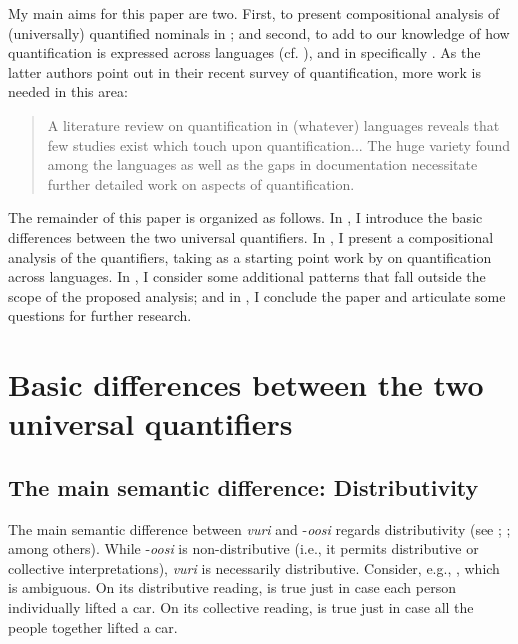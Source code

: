 \documentclass[output=paper]{langsci/langscibook}
\begin{document}
My main aims for this paper are two. First, to present compositional analysis of (universally) quantified nominals in ; and second, to add to our knowledge of how quantification is expressed across languages (cf. \citealt{Matthewson2013}), and in  specifically \citep{ZerbianKrifka2008}. As the latter authors point out in their recent survey of  quantification, more work is needed in this area:

\begin{quote}
A literature review on quantification in (whatever)  languages reveals that few studies exist which touch upon quantification... The huge variety found among the  languages as well as the gaps in documentation necessitate further detailed work on aspects of quantification. \citep[383, 412]{ZerbianKrifka2008}
\end{quote}

The remainder of this paper is organized as follows. In , I introduce the basic differences between the two universal quantifiers. In , I present a compositional analysis of the quantifiers, taking as a starting point work by \citet{Matthewson2013} on quantification across languages. In , I consider some additional patterns that fall outside the scope of the proposed analysis; and in , I conclude the paper and articulate some questions for further research.

\section{Basic differences between the two universal quantifiers}\label{sec:landman:2}
\subsection{The main semantic difference: Distributivity} 

The main semantic difference between \textit{vuri} and -\textit{oosi} regards distributivity (see \citealt{Gil1995}; \citealt{Vendler1962}; among others). While -\textit{oosi} is non-distributive (i.e., it permits distributive or collective interpretations), \textit{vuri} is necessarily distributive. Consider, e.g., , which is ambiguous. On its distributive reading,  is true just in case each person individually lifted a car. On its collective reading,  is true just in case all the people together lifted a car.
\end{document}

